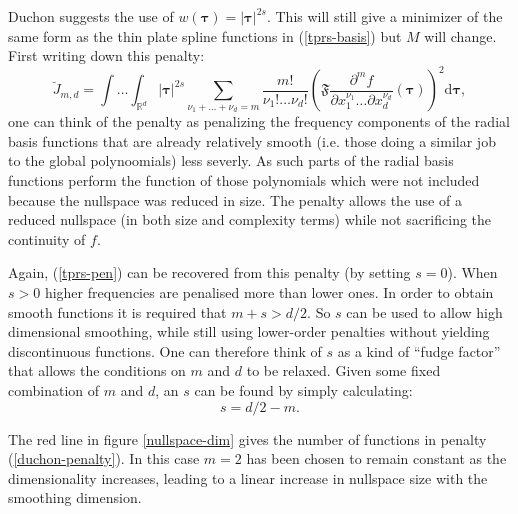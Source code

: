 Duchon suggests the use of $w(\boldsymbol{\tau})= \lvert \boldsymbol{\tau} \rvert^{2s}$. This will still give a minimizer of the same form as the thin plate spline functions in (\ref{tprs-basis}) but $M$ will change. First writing down this penalty:
\begin{equation}
\breve{J}_{m,d} = \int \ldots \int_{\mathbb{R}^d} \lvert \boldsymbol{\tau} \rvert^{2s} \sum_{\nu_1 + \dots + \nu_d=m} \frac{m!}{\nu_1! \dots \nu_d!}\left ( \mathfrak{F} \frac{\partial^m f}{\partial x_1^{\nu_1} \ldots  \partial x_d^{\nu_d}} \left (\boldsymbol{\tau} \right ) \right )^2 \text{d} \boldsymbol{\tau},
\label{duchon-penalty}
\end{equation}
one can think of the penalty as penalizing the frequency components of the radial basis functions that are already relatively smooth (i.e. those doing a similar job to the global polynoomials) less severly. As such parts of  the radial basis functions perform the function of those polynomials which were not included because the nullspace was reduced in size. The penalty allows the use of a reduced nullspace (in both size and complexity terms) while not sacrificing the continuity of $f$. 

Again, (\ref{tprs-pen}) can be recovered from this penalty (by setting $s=0$). When $s>0$ higher frequencies are penalised more than lower ones. In order to obtain smooth functions it is required that $m+s>d/2$. So $s$ can be used to allow high dimensional smoothing, while still using lower-order penalties without yielding discontinuous functions. One can therefore think of $s$ as a kind of ``fudge factor'' that allows the conditions on $m$ and $d$ to be relaxed. Given some fixed combination of $m$ and $d$, an $s$ can be found by simply calculating:
\begin{equation}
s=d/2-m.
\label{duchon-s-eqn}
\end{equation}

The red line in figure \ref{nullspace-dim} gives the number of functions in penalty (\ref{duchon-penalty}). In this case $m=2$ has been chosen to remain constant as the dimensionality increases, leading to a linear increase in nullspace size with the smoothing dimension.


